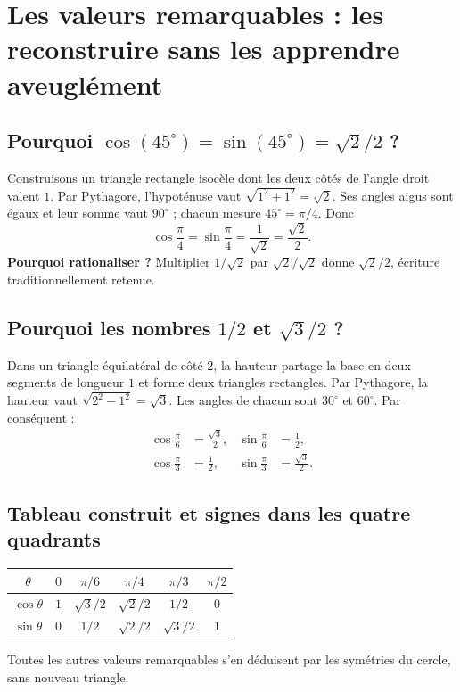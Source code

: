 \documentclass[../cours_spe_trigo.tex]{subfiles}
\begin{document}
\setcounter{chapter}{4}
\chapter{Les valeurs remarquables : les reconstruire sans les apprendre aveuglément}
\section{Pourquoi $\cos(45^\circ)=\sin(45^\circ)=\sqrt2/2$ ?}
Construisons un triangle rectangle isocèle dont les deux côtés de l'angle droit valent $1$. Par Pythagore, l'hypoténuse vaut $\sqrt{1^2+1^2}=\sqrt2$. Ses angles aigus sont égaux et leur somme vaut $90^\circ$ ; chacun mesure $45^\circ=\pi/4$. Donc
\[
\boxed{\cos\frac\pi4=\sin\frac\pi4=\frac1{\sqrt2}=\frac{\sqrt2}{2}.}
\]
\textbf{Pourquoi rationaliser ?} Multiplier $1/\sqrt2$ par $\sqrt2/\sqrt2$ donne $\sqrt2/2$, écriture traditionnellement retenue.

\section{Pourquoi les nombres $1/2$ et $\sqrt3/2$ ?}
Dans un triangle équilatéral de côté $2$, la hauteur partage la base en deux segments de longueur $1$ et forme deux triangles rectangles. Par Pythagore, la hauteur vaut $\sqrt{2^2-1^2}=\sqrt3$. Les angles de chacun sont $30^\circ$ et $60^\circ$. Par conséquent :
\[
\boxed{\begin{aligned}
\cos\frac\pi6&=\frac{\sqrt3}{2},&\sin\frac\pi6&=\frac12,\\
\cos\frac\pi3&=\frac12,&\sin\frac\pi3&=\frac{\sqrt3}{2}.
\end{aligned}}
\]
\begin{center}
\end{center}
\section{Tableau construit et signes dans les quatre quadrants}
\begin{center}
\renewcommand{\arraystretch}{1.45}
\begin{tabular}{c|ccccc}
\toprule
$\theta$ & $0$ & $\pi/6$ & $\pi/4$ & $\pi/3$ & $\pi/2$ \\
\midrule
$\cos\theta$ & $1$ & $\sqrt3/2$ & $\sqrt2/2$ & $1/2$ & $0$\\
$\sin\theta$ & $0$ & $1/2$ & $\sqrt2/2$ & $\sqrt3/2$ & $1$\\
\bottomrule
\end{tabular}
\end{center}
Toutes les autres valeurs remarquables s'en déduisent par les symétries du cercle, sans nouveau triangle.
\end{document}
